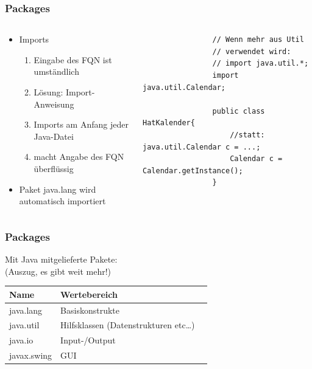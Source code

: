 \begin{frame}[fragile] 
	  \frametitle{Packages}
		 \begin{columns}
		 \begin{column}{0.5\textwidth}
			  \small
			  \begin{itemize}
			  	\item Imports
				  	\begin{enumerate}
				  	  \item Eingabe des FQN ist umst\"andlich
				  	  \item L\"osung: Import-Anweisung
				  	  \item Imports am Anfang jeder Java-Datei
				  	  \item macht Angabe des FQN \"uberfl\"ussig
				  	\end{enumerate}
				\item Paket java.lang wird automatisch
				importiert
			  \end{itemize}
		 \end{column}
		 \begin{column}{0.5\textwidth}
		 	\begin{lstlisting}
		 		// Wenn mehr aus Util 
		 		// verwendet wird:
		 		// import java.util.*;
		 		import java.util.Calendar;
		 		
		 		public class HatKalender{
		 		 	//statt: java.util.Calendar c = ...;
		 			Calendar c = Calendar.getInstance();
		 		}
		 	\end{lstlisting}
		 \end{column}
		 \end{columns}
\end{frame}

\begin{frame}[fragile]
	\frametitle{Packages}
	Mit Java mitgelieferte Pakete:\\
	(Auszug, es gibt weit mehr!)
	\begin{table}
		\begin{tabular}{l|l|l}
			Name & Wertebereich \\ \hline
			java.lang  & Basiskonstrukte \\ 
			java.util & Hilfsklassen (Datenstrukturen etc\ldots)  \\
			java.io & Input-/Output \\
			javax.swing & GUI 
		\end{tabular}
	\end{table}
	\normalsize
\end{frame}

